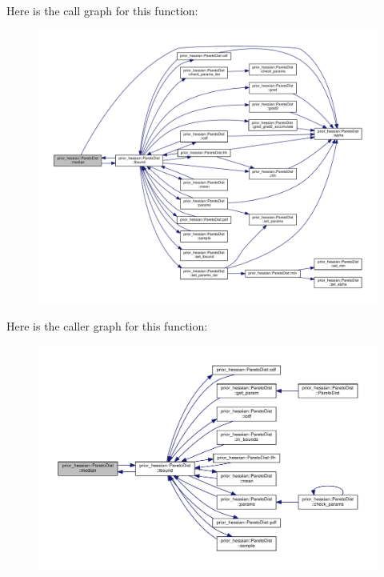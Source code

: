 Here is the call graph for this function\+:\nopagebreak
\begin{figure}[H]
\begin{center}
\leavevmode
\includegraphics[width=350pt]{classprior__hessian_1_1ParetoDist_a74af41636088b6c727107c60dd9c81b2_cgraph}
\end{center}
\end{figure}




Here is the caller graph for this function\+:\nopagebreak
\begin{figure}[H]
\begin{center}
\leavevmode
\includegraphics[width=350pt]{classprior__hessian_1_1ParetoDist_a74af41636088b6c727107c60dd9c81b2_icgraph}
\end{center}
\end{figure}


